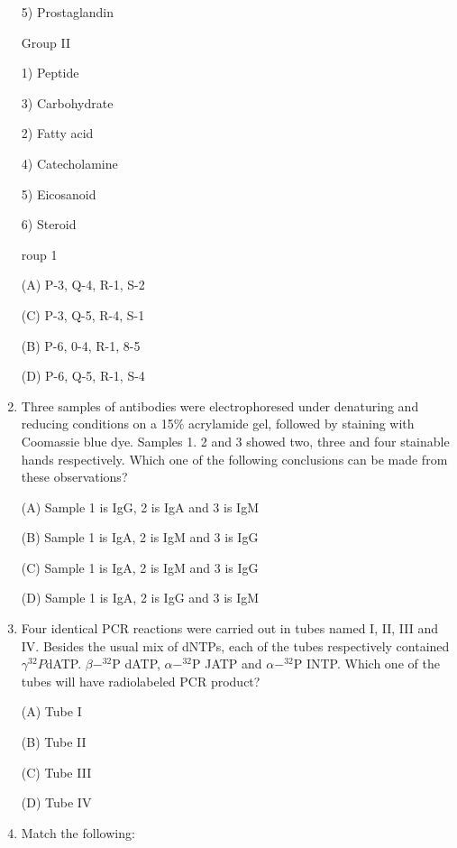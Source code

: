 \documentclass[journal]{IEEEtran}
\begin{document}
\begin{enumerate}
\begin{minipage}{0.5\textwidth}
\begin{flushleft}
5) Prostaglandin

		\end{flushleft}
		\end{minipage}
	\begin{minipage}{0.5\textwidth}
		\begin{flushleft}
Group II

1) Peptide

3) Carbohydrate

2) Fatty acid

4) Catecholamine

5) Eicosanoid

6) Steroid
		\end{flushleft}
		\end{minipage}roup 1


(A) P-3, Q-4, R-1, S-2

(C) P-3, Q-5, R-4, S-1


(B) P-6, 0-4, R-1, 8-5

(D) P-6, Q-5, R-1, S-4

\item {Three samples of antibodies were electrophoresed under denaturing and reducing conditions on a 15\% acrylamide gel, followed by staining with Coomassie blue dye. Samples 1. 2 and 3 showed two, three and four stainable hands respectively. Which one of the following conclusions can be made from these observations?

(A) Sample 1 is IgG, 2 is IgA and 3 is IgM

(B) Sample 1 is IgA, 2 is IgM and 3 is IgG

(C) Sample 1 is IgA, 2 is IgM and 3 is IgG

(D) Sample 1 is IgA, 2 is IgG and 3 is IgM}

\item {Four identical PCR reactions were carried out in tubes named I, II, III and IV. Besides the usual mix of dNTPs, each of the tubes respectively contained $\gamma^{32}P$dATP. $\beta-^{32}$P dATP, $\alpha-^{32}$P JATP and $\alpha - ^{32}$P INTP. Which one of the tubes will have radiolabeled PCR product?

(A) Tube I

(B) Tube II

(C) Tube III

(D) Tube IV}

\item {Match the following:}


\begin{minipage}{0.5\textwidth}
\begin{flushleft}


\end{flushleft}
\end{minipage}
\end{enumerate}
\end{document}
